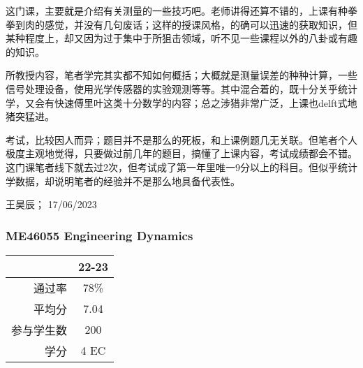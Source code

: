 这门课，主要就是介绍有关测量的一些技巧吧。老师讲得还算不错的，上课有种拳拳到肉的感觉，并没有几句废话；这样的授课风格，的确可以迅速的获取知识，但某种程度上，却又因为过于集中于所狙击领域，听不见一些课程以外的八卦或有趣的知识。

所教授内容，笔者学完其实都不知如何概括；大概就是测量误差的种种计算，一些信号处理设备，使用光学传感器的实验观测等等。其中混合着的，既十分关乎统计学，又会有快速傅里叶这类十分数学的内容；总之涉猎非常广泛，上课也delft式地猪突猛进。

考试，比较因人而异；题目并不是那么的死板，和上课例题几无关联。但笔者个人极度主观地觉得，只要做过前几年的题目，搞懂了上课内容，考试成绩都会不错。这门课笔者线下就去过2次，但考试成了第一年里唯一9分以上的科目。但似乎统计学数据，却说明笔者的经验并不是那么地具备代表性。

\begin{flushright}
王昊辰； 17/06/2023
\end{flushright}

\subsubsection{ME46055 Engineering Dynamics}
\begin{minipage}{0.45\textwidth}
\centering
{}
\end{minipage}%
\begin{minipage}{0.45\textwidth}
\raggedleft
\begin{tabular}{r|c}
\textbf{ } & \textbf{22-23} \\ \hline
通过率 & 78\% \\ 
平均分 & 7.04\\ 
参与学生数 & 200 \\ 
学分 & 4 EC\\
\end{tabular}
\end{minipage}\\

